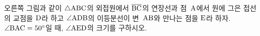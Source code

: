 \noindent\begin{minipage}[t]{0.58\linewidth}\vspace{0pt}\raggedright 오른쪽 그림과 같이 $\triangle\mathrm{ABC}$의 외접원에서 $\overline{\mathrm{BC}}$의 연장선과 점~$\mathrm{A}$에서 원에 그은 접선의 교점을 $\mathrm{D}$라 하고 $\angle\mathrm{ADB}$의 이등분선이 변~$\mathrm{AB}$와 만나는 점을 $\mathrm{E}$라 하자. $\angle\mathrm{BAC}=50^\circ$일 때, $\angle\mathrm{AED}$의 크기를 구하시오.\end{minipage}\hfill\begin{minipage}[t]{0.4\linewidth}\vspace{0pt}\centering \resizebox{\ifdim\width>\linewidth\linewidth\else\width\fi}{!}{}\end{minipage}\par
